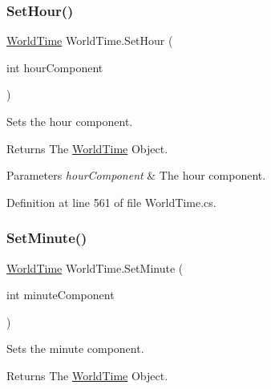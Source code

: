 \mbox{\label{struct_world_time_a069397a3e352a589a89a7c8bca18a66a}} 
\subsubsection{\texorpdfstring{Set\+Hour()}{SetHour()}}
{\footnotesize\ttfamily \hyperlink{struct_world_time}{World\+Time} World\+Time.\+Set\+Hour (\begin{DoxyParamCaption}\item[{int}]{hour\+Component }\end{DoxyParamCaption})}



Sets the hour component. 

\begin{DoxyReturn}{Returns}
The \hyperlink{struct_world_time}{World\+Time} Object.
\end{DoxyReturn}

\begin{DoxyParams}{Parameters}
{\em hour\+Component} & The hour component.\\
\hline
\end{DoxyParams}


Definition at line 561 of file World\+Time.\+cs.

\mbox{\label{struct_world_time_aebfbe17309895d4d21abc2e0dd612019}} 
\subsubsection{\texorpdfstring{Set\+Minute()}{SetMinute()}}
{\footnotesize\ttfamily \hyperlink{struct_world_time}{World\+Time} World\+Time.\+Set\+Minute (\begin{DoxyParamCaption}\item[{int}]{minute\+Component }\end{DoxyParamCaption})}



Sets the minute component. 

\begin{DoxyReturn}{Returns}
The \hyperlink{struct_world_time}{World\+Time} Object.
\end{DoxyReturn}

